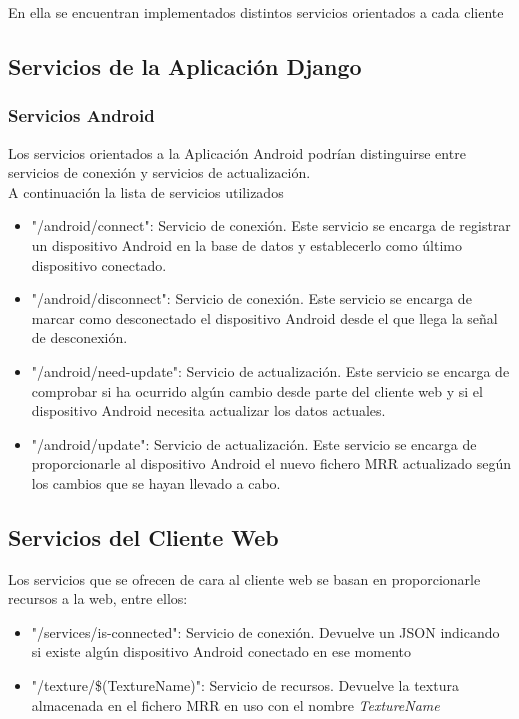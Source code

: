 En ella se encuentran implementados distintos servicios orientados a cada cliente
\subsection{Servicios de la Aplicación Django}

\subsubsection{Servicios Android}
Los servicios orientados a la Aplicación Android podrían distinguirse entre servicios de conexión y servicios de actualización.\\
A continuación la lista de servicios utilizados
\begin{itemize}
\item "\slash android/connect": Servicio de conexión. Este servicio se encarga de registrar un dispositivo Android en la base de datos y establecerlo como último dispositivo conectado.
\item "\slash android/disconnect": Servicio de conexión. Este servicio se encarga de marcar como desconectado el dispositivo Android desde el que llega la señal de desconexión.
\item "\slash android/need-update": Servicio de actualización. Este servicio se encarga de comprobar si ha ocurrido algún cambio desde parte del cliente web y si el dispositivo Android necesita actualizar los datos actuales.
\item "\slash android/update": Servicio de actualización. Este servicio se encarga de proporcionarle al dispositivo Android el nuevo fichero MRR actualizado según los cambios que se hayan llevado a cabo.
\end{itemize}

\subsection{Servicios del Cliente Web}
Los servicios que se ofrecen de cara al cliente web se basan en proporcionarle recursos a la web, entre ellos:
\begin{itemize}
\item "\slash services/is-connected": Servicio de conexión. Devuelve un JSON indicando si existe algún dispositivo Android conectado en ese momento
\item "\slash texture/\$(TextureName)": Servicio de recursos. Devuelve la textura almacenada en el fichero MRR en uso con el nombre \textit{TextureName}
\end{itemize}

